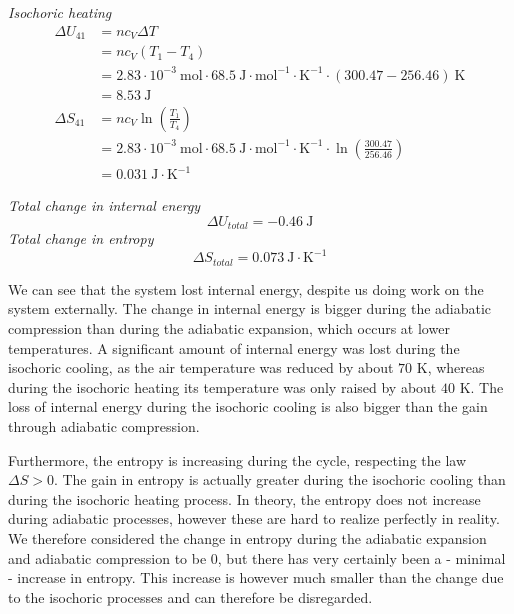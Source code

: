 \documentclass{scrartcl}
\begin{document}
\textit{Isochoric heating}
\begin{align*}
    \Delta U_{41} &= nc_V \Delta T \\
    &= nc_V(T_1 - T_4) \\
    &= 2.83 \cdot 10^{-3} \ \text{mol} \cdot 68.5 \ \text{J} \cdot \text{mol}^{-1} \cdot \text{K}^{-1} \cdot (300.47-256.46) \ \text{K} \\
    &= 8.53 \ \text{J} \\
    \Delta S_{41} &= nc_V \ln \left( \frac{T_1}{T_4} \right) \\
    &= 2.83 \cdot 10^{-3} \ \text{mol} \cdot 68.5 \ \text{J} \cdot \text{mol}^{-1} \cdot \text{K}^{-1} \cdot \ln \left( \frac{300.47}{256.46} \right) \\
    &= 0.031 \ \text{J} \cdot \text{K}^{-1}
\end{align*}

\textit{Total change in internal energy}
\begin{equation*}
    \Delta U_{total} = -0.46 \ \text{J}    
\end{equation*}
\textit{Total change in entropy}
\begin{equation*}
    \Delta S_{total} = 0.073 \ \text{J} \cdot \text{K}^{-1}   
\end{equation*}

We can see that the system lost internal energy, despite us doing work on the system externally. The change in internal energy is bigger during the adiabatic compression than during the adiabatic expansion, which occurs at lower temperatures. A significant amount of internal energy was lost during the isochoric cooling, as the air temperature was reduced by about $70$ K, whereas during the isochoric heating its temperature was only raised by about $40$ K. The loss of internal energy during the isochoric cooling is also bigger than the gain through adiabatic compression.

Furthermore, the entropy is increasing during the cycle, respecting the law $\Delta S > 0$. The gain in entropy is actually greater during the isochoric cooling than during the isochoric heating process. In theory, the entropy does not increase during adiabatic processes, however these are hard to realize perfectly in reality. We therefore considered the change in entropy during the adiabatic expansion and adiabatic compression to be 0, but there has very certainly been a - minimal - increase in entropy. This increase is however much smaller than the change due to the isochoric processes and can therefore be disregarded.
\end{document}
